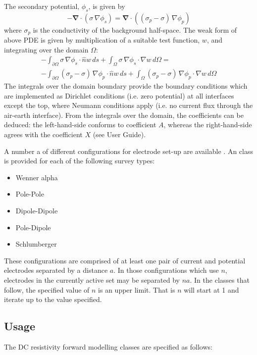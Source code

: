 The secondary potential, $\phi_s$, is given by
\begin{equation}\label{ref:dcres:eq4}
-\mathbf{\nabla}\cdot\left(\sigma\,\nabla \phi_s \right)  = 
 \mathbf{\nabla}\cdot\left( \left(\sigma_p-\sigma\right)\,\nabla \phi_p  \right)
\end{equation} 
where $\sigma_p$ is the conductivity of the background half-space.
The weak form of above PDE is given by multiplication of a suitable test function, $w$, and integrating over the domain $\Omega$:
\begin{multline}\label{ref:dcres:eq5}
-\int_{\partial\Omega} \sigma\,\nabla \phi_s  \cdot \hat{n} w\,ds +
 \int_{\Omega} \sigma\,\nabla \phi_s  \cdot \nabla w\,d\Omega =\\
-\int_{\partial\Omega} \left(\sigma_p-\sigma\right)\,\nabla \phi_p  
\cdot \hat{n} w\,ds + \int_{\Omega} \left(\sigma_p-\sigma\right)\,\nabla \phi_p  \cdot \nabla w\,d\Omega 
\end{multline}
The integrals over the domain boundary provide the boundary conditions which are
implemented as Dirichlet conditions (i.e. zero potential) at all interfaces except the
top, where Neumann conditions apply (i.e. no current flux through the air-earth interface).
From the integrals over the domain, the \escript coefficients can be deduced: the 
left-hand-side conforms to \escript coefficient $A$, whereas the right-hand-side agrees
with the coefficient $X$ (see User Guide).

A number a of different configurations for electrode set-up are available \cite[pg 5]{LOKE2014}.
An \escript class is provided for each of the following survey types:
\begin{itemize}
\item Wenner alpha
\item Pole-Pole
\item Dipole-Dipole
\item Pole-Dipole
\item Schlumberger
\end{itemize}

These configurations are comprised of at least one pair of current and potential
electrodes separated by a distance $a$. In those configurations which use $n$,
electrodes in the currently active set may be separated by $na$. In the classes
that follow, the specified value of $n$ is an upper limit. That is $n$ will
start at 1 and iterate up to the value specified.

\subsection{Usage}
The DC resistivity forward modelling classes are specified as follows:

